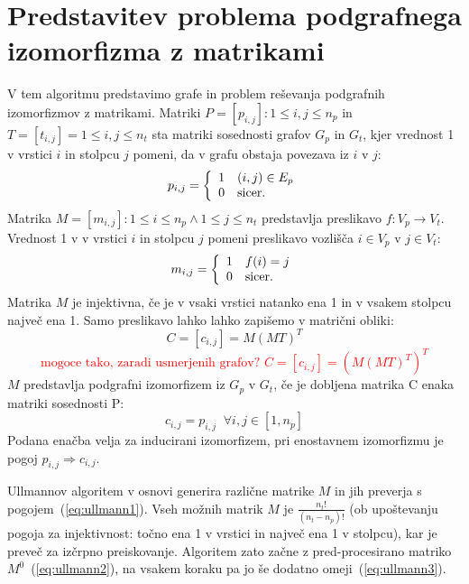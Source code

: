 \documentclass[a4paper, 12pt, ]{book}
\newcommand{\TODO}[1]{\textcolor{red}{#1}}
\begin{document}
	\section{Predstavitev problema podgrafnega izomorfizma z matrikami}
	V tem algoritmu predstavimo grafe in problem reševanja podgrafnih izomorfizmov z matrikami. Matriki $P = [p_{i,j}] : 1 \le i,j \le n_p $ in
	$T = [t_{i,j}] = 1 \le i,j \le n_t$ sta matriki sosednosti grafov $G_p$ in $G_t$, kjer vrednost 1 v vrstici $i$ in stolpcu $j$ pomeni, 
	da v grafu obstaja povezava
	iz $i$ v $j$:
		\begin{equation}
		 	p_{i,j} = \left\{
			\begin{array}{l l}
			    1 & (i,j) \in E_p\\
			    0 & \text{sicer.}
			\end{array} \right.
		\end{equation}
	Matrika $M = [m_{i,j}]: 1 \le i \le n_p \wedge 1 \le j \le n_t$ predstavlja preslikavo $f: V_p \to V_t$. Vrednost 1 v v vrstici $i$ in stolpcu $j$ 
	pomeni preslikavo vozlišča
	$i \in V_p$ v $j \in V_t$:
		\begin{equation}
			m_{i,j} = \left\{
			\begin{array}{l l}
			    1 & f(i) = j\\
			    0 & \text{sicer.}
			\end{array} \right.
		\end{equation}
	Matrika $M$ je injektivna, če je v vsaki vrstici natanko ena 1 in v vsakem stolpcu največ ena 1. Samo preslikavo lahko lahko zapišemo v matrični obliki:
		\begin{equation}
			C = [c_{i,j}] = M(MT)^T
		\end{equation}
		\TODO{
		$$%
			\text{mogoce tako, zaradi usmerjenih grafov? } C = [c_{i,j}] = (M(MT)^T)^T
		$$%
		}
	$M$ predstavlja podgrafni izomorfizem iz $G_p$ v $G_t$, če je dobljena matrika C enaka matriki sosednosti P:
		\begin{equation}
			\label{eq:ullmann1}
			c_{i,j} = p_{i,j}\;\; \forall i,j \in [1, n_p]
		\end{equation}	 
	Podana enačba velja za inducirani izomorfizem, pri enostavnem izomorfizmu je pogoj $p_{i,j} \Rightarrow c_{i, j}$.
	
	Ullmannov algoritem v osnovi generira različne matrike $M$ in jih preverja s pogojem~(\ref{eq:ullmann1}). Vseh možnih matrik $M$ je
	$\frac{n_t!}{(n_t-n_p)!}$ (ob upoštevanju pogoja za injektivnost: točno ena 1 v vrstici in največ ena 1 v stolpcu), kar je preveč za izčrpno preiskovanje.
	Algoritem zato začne z pred-procesirano matriko $M^0$~(\ref{eq:ullmann2}), na vsakem koraku pa jo še dodatno omeji~(\ref{eq:ullmann3}).
	
\end{document}
